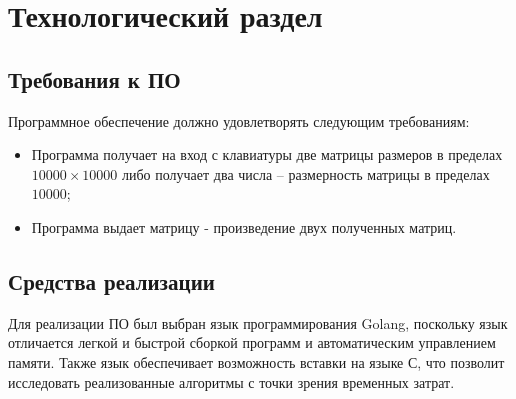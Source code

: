 \chapter{Технологический раздел}

\section{Требования к ПО}

Программное обеспечение должно удовлетворять следующим требованиям:
\begin{itemize}
	\item Программа получает на вход с клавиатуры две матрицы размеров в пределах $10000 \times 10000$ либо получает два числа -- размерность матрицы в пределах $10000$;
	\item Программа выдает матрицу - произведение двух полученных матриц.
\end{itemize}

\section{Средства реализации} 
Для реализации ПО был выбран язык программирования Golang, поскольку язык отличается легкой и быстрой сборкой программ и автоматическим управлением памяти. Также язык обеспечивает возможность вставки на языке С, что позволит исследовать реализованные алгоритмы с точки зрения временных затрат.

